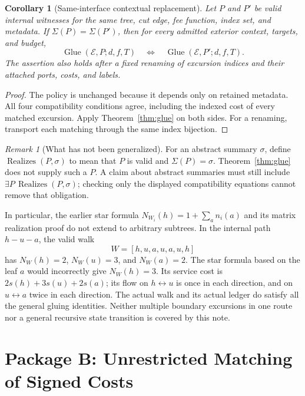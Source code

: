 \documentclass[11pt]{article}
\newtheorem{corollary}[definition]{Corollary}
\theoremstyle{remark}
\newtheorem{remark}[definition]{Remark}
\newcommand{\Glue}{\operatorname{Glue}}
\newcommand{\Real}{\operatorname{Realizes}}
\begin{document}
\begin{corollary}[Same-interface contextual replacement]
\label{cor:replacement}
Let $P$ and $P'$ be valid internal witnesses for the same tree, cut edge,
fee function, index set, and metadata. If $\Sigma(P)=\Sigma(P')$, then for
every admitted exterior context, targets, and budget,
\[
 \Glue(\mathcal E,P;d,f,T)
 \quad\Longleftrightarrow\quad
 \Glue(\mathcal E,P';d,f,T).
\]
The assertion also holds after a fixed renaming of excursion indices and
their attached ports, costs, and labels.
\end{corollary}
\begin{proof}
The policy is unchanged because it depends only on retained metadata.
All four compatibility conditions agree, including the indexed cost of every
matched excursion. Apply Theorem~\ref{thm:glue} on both sides. For a renaming,
transport each matching through the same index bijection.
\end{proof}

\begin{remark}[What has not been generalized]
\label{rem:realization}
For an abstract summary $\sigma$, define
$\Real(P,\sigma)$ to mean that $P$ is valid and $\Sigma(P)=\sigma$.
Theorem~\ref{thm:glue} does not supply such a $P$. A claim about abstract
summaries must still include $\exists P\,\Real(P,\sigma)$; checking only the
displayed compatibility equations cannot remove that obligation.

In particular, the earlier star formula
$N_{W_i}(h)=1+\sum_a n_i(a)$ and its matrix realization proof do not extend
to arbitrary subtrees. In the internal path $h-u-a$, the valid walk
\[
 W=[h,u,a,u,a,u,h]
\]
has $N_W(h)=2$, $N_W(u)=3$, and $N_W(a)=2$. The star formula based on the
leaf $a$ would incorrectly give $N_W(h)=3$. Its service cost is
$2s(h)+3s(u)+2s(a)$; its flow on $h\leftrightarrow u$ is once in each
direction, and on $u\leftrightarrow a$ twice in each direction. The actual
walk and its actual ledger do satisfy all the general gluing identities.
Neither multiple boundary excursions in one route nor a general recursive
state transition is covered by this note.
\end{remark}

\section{Package B: Unrestricted Matching of Signed Costs}
\label{sec:package-b}
\end{document}

